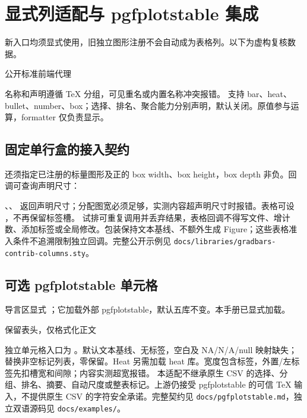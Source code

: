 \section{显式列适配与 pgfplotstable 集成}
新入口均须显式使用，旧独立图形注册不会自动成为表格列。以下为虚构复核数据。
\begin{example}[text and listing,sidebyside=false]{公开标准前端代理}
\begingroup
{}
\begin{gradtable}[style=adapter-report,width=\linewidth]
\end{gradtable}
\endgroup
\end{example}
名称和声明遵循 TeX 分组，可见重名或内置名称冲突报错。 支持 bar、heat、bullet、number、box；选择、排名、聚合能力分别声明，默认关闭。原值参与运算，formatter 仅负责显示。
\subsection{固定单行盒的接入契约}
 还须指定已注册的标量图形及正的 box width、box height，box depth 非负。回调可查询声明尺寸：\par\key{\gradbarscolumnwidth}、\allowbreak\key{\gradbarscolumnheight}、\allowbreak\key{\gradbarscolumndepth} 返回声明尺寸；分配图宽必须足够，实测内容超声明尺寸时报错。表格可设 ，不再保留标签槽。
试排可重复调用并丢弃结果，表格回调不得写文件、增计数、添加标签或全局修改。包装保持文本基线、不额外生成 Figure；这些表格准入条件不追溯限制独立回调。完整公开示例见 \texttt{docs/libraries/gradbars-contrib-columns.sty}。
\clearpage
\subsection{可选 pgfplotstable 单元格}
导言区显式 ；它加载外部 pgfplotstable，默认五库不变。本手册已显式加载。
\begin{example}[text and listing,sidebyside=false]{保留表头，仅格式化正文}
\begingroup
{}
\endgroup
\end{example}
独立单元格入口为 。默认文本基线、无标签，空白及 NA/N/A/null 映射缺失； 替换非空标记列表，零保留。Heat 另需加载 heat 库。宽度包含标签，外置/左标签先扣槽宽和间隙；内容实测超宽报错。
本适配不继承原生 CSV 的选择、分组、排名、摘要、自动尺度或整表标记。上游仍接受 pgfplotstable 的可信 TeX 输入，不提供原生 CSV 的字符安全承诺。完整契约见 \texttt{docs/pgfplotstable.md}，独立双语源码见 \texttt{docs/examples/}。
